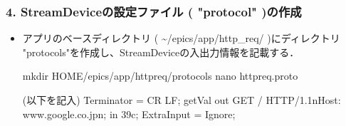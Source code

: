\documentclass[letterpaper,10pt,dvipdfmx]{sphinxmanual}
\begin{document}
\subsubsection{4. StreamDeviceの設定ファイル ( "protocol" )の作成}
\label{\detokenize{epics/rst/example1__httpRequest_to_Google:streamdevice-protocol}}\begin{itemize}
\item {} 
アプリのベースディレクトリ ( \textasciitilde{}/epics/app/http\_req/ )にディレクトリ "protocols"を作成し、StreamDeviceの入出力情報を記載する．

\begin{sphinxVerbatim}[commandchars=\\\{\}]
\PYGZdl{} mkdir \PYGZdl{}HOME/epics/app/http\PYGZus{}req/protocols
\PYGZdl{} nano http\PYGZus{}req.proto

(以下を記入)
Terminator = CR LF;
getVal \PYGZob{}
out \PYGZdq{}GET / HTTP/1.1\PYGZbs{}nHost: www.google.co.jp\PYGZbs{}n\PYGZdq{};
in \PYGZdq{}\PYGZpc{}39c\PYGZdq{};
ExtraInput = Ignore;
\PYGZcb{}
\end{sphinxVerbatim}

\end{itemize}
\end{document}
